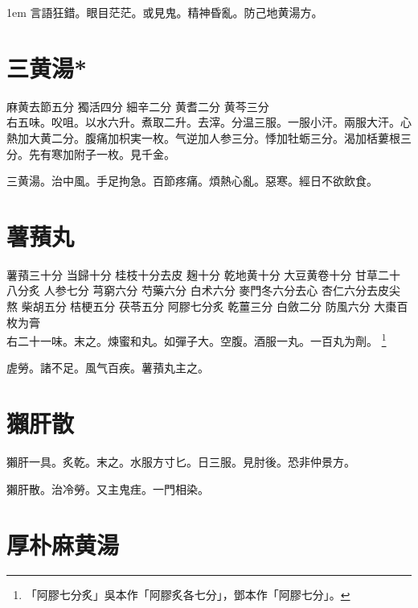 \hangindent 1em
言語狂錯。眼目茫茫。或見鬼。精神昏亂。防己地黄湯方。{\qianjin}

\section{三黄湯*}

麻黄{\scriptsize 去節五分} 獨活{\scriptsize 四分} 細辛{\scriptsize 二分} 黄耆{\scriptsize 二分} 黄芩{\scriptsize 三分}\\
右五味。㕮咀。以水六升。煮取二升。去滓。分温三服。一服小汗。兩服大汗。心熱加大黄二分。腹痛加枳実一枚。气逆加人参三分。悸加牡蛎三分。渴加栝蔞根三分。先有寒加附子一枚。{\scriptsize 見千金。}

三黄湯。治中風。手足拘急。百節疼痛。煩熱心亂。惡寒。經日不欲飲食。

\section{薯蕷丸}

薯蕷{\scriptsize 三十分} 当歸{\scriptsize 十分} 桂枝{\scriptsize 十分去皮} 麹{\scriptsize 十分} 乾地黄{\scriptsize 十分} 大豆黄卷{\scriptsize 十分} 甘草{\scriptsize 二十八分炙} 人参{\scriptsize 七分} 芎窮{\scriptsize 六分} 芍藥{\scriptsize 六分} 白术{\scriptsize 六分} 麥門冬{\scriptsize 六分去心} 杏仁{\scriptsize 六分去皮尖熬} 柴胡{\scriptsize 五分} 桔梗{\scriptsize 五分} 茯苓{\scriptsize 五分} 阿膠{\scriptsize 七分炙} 乾薑{\scriptsize 三分} 白斂{\scriptsize 二分} 防風{\scriptsize 六分} 大棗{\scriptsize 百枚为膏}\\
右二十一味。末之。煉蜜和丸。如彈子大。空腹。酒服一丸。一百丸为劑。
	\footnote{
		「阿膠七分炙」吳本作「阿膠炙各七分」，鄧本作「阿膠七分」。
	}

虗勞。諸不足。風气百疾。薯蕷丸主之。

\section{獺肝散}

獺肝一具。炙乾。末之。水服方寸匕。日三服。{\scriptsize 見肘後。恐非仲景方。}{\wuben}


獺肝散。治冷勞。又主鬼疰。一門相染。

\section{厚朴麻黄湯}

